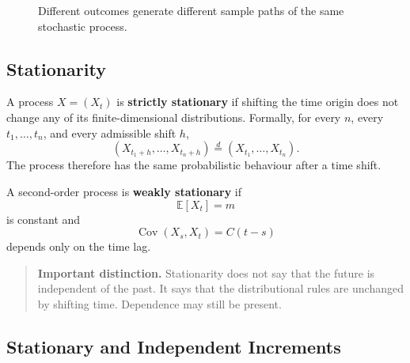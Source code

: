 \documentclass[12pt,openany]{book}
\theoremstyle{definition}
\theoremstyle{remark}
\begin{document}
\begin{figure}[H]
\centering
{}
\caption{Different outcomes generate different sample paths of the same
stochastic process.}
\label{fig:stochastic-process-sample-paths}
\end{figure}

\subsection{Stationarity}

A process \(X=(X_t)\) is \textbf{strictly stationary} if shifting the time
origin does not change any of its finite-dimensional distributions. Formally,
for every \(n\), every \(t_1,\ldots,t_n\), and every admissible shift \(h\),
\[
(X_{t_1+h},\ldots,X_{t_n+h})
\overset{d}{=}
(X_{t_1},\ldots,X_{t_n}).
\]
The process therefore has the same probabilistic behaviour after a time
shift.

A second-order process is \textbf{weakly stationary} if
\[
\mathbb{E}[X_t]=m
\]
is constant and
\[
\operatorname{Cov}(X_s,X_t)=C(t-s)
\]
depends only on the time lag.

\begin{quote}
\textbf{Important distinction.} Stationarity does not say that the future is
independent of the past. It says that the distributional rules are unchanged
by shifting time. Dependence may still be present.
\end{quote}

\subsection{Stationary and Independent Increments}
\end{document}
